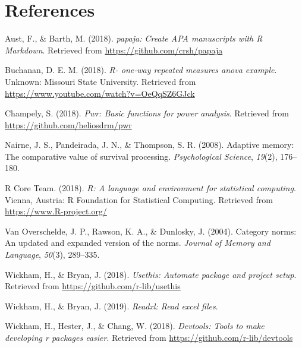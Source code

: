 \documentclass[man]{apa6}
\begin{document}
\newpage

\hypertarget{references}{%
\section{References}\label{references}}

\begingroup
\setlength{\parindent}{-0.5in}
\setlength{\leftskip}{0.5in}

\hypertarget{refs}{}
\leavevmode\hypertarget{ref-R-papaja}{}%
Aust, F., \& Barth, M. (2018). \emph{papaja: Create APA manuscripts with R Markdown}. Retrieved from \url{https://github.com/crsh/papaja}

\leavevmode\hypertarget{ref-R-One-WayVid}{}%
Buchanan, D. E. M. (2018). \emph{R- one-way repeated measures anova example}. Unknown: Missouri State University. Retrieved from \url{https://www.youtube.com/watch?v=OeQqSZ6GJck}

\leavevmode\hypertarget{ref-R-pwr}{}%
Champely, S. (2018). \emph{Pwr: Basic functions for power analysis}. Retrieved from \url{https://github.com/heliosdrm/pwr}

\leavevmode\hypertarget{ref-nairne2008adaptive}{}%
Nairne, J. S., Pandeirada, J. N., \& Thompson, S. R. (2008). Adaptive memory: The comparative value of survival processing. \emph{Psychological Science}, \emph{19}(2), 176--180.

\leavevmode\hypertarget{ref-R-base}{}%
R Core Team. (2018). \emph{R: A language and environment for statistical computing}. Vienna, Austria: R Foundation for Statistical Computing. Retrieved from \url{https://www.R-project.org/}

\leavevmode\hypertarget{ref-van2004category}{}%
Van Overschelde, J. P., Rawson, K. A., \& Dunlosky, J. (2004). Category norms: An updated and expanded version of the norms. \emph{Journal of Memory and Language}, \emph{50}(3), 289--335.

\leavevmode\hypertarget{ref-R-usethis}{}%
Wickham, H., \& Bryan, J. (2018). \emph{Usethis: Automate package and project setup}. Retrieved from \url{https://github.com/r-lib/usethis}

\leavevmode\hypertarget{ref-R-readxl}{}%
Wickham, H., \& Bryan, J. (2019). \emph{Readxl: Read excel files}.

\leavevmode\hypertarget{ref-R-devtools}{}%
Wickham, H., Hester, J., \& Chang, W. (2018). \emph{Devtools: Tools to make developing r packages easier}. Retrieved from \url{https://github.com/r-lib/devtools}

\endgroup
\end{document}
